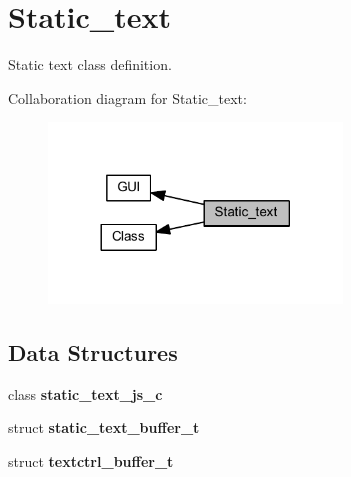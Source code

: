 \section{Static\+\_\+text}
\label{group___static__text}


Static text class definition.  


Collaboration diagram for Static\+\_\+text\+:
\nopagebreak
\begin{figure}[H]
\begin{center}
\leavevmode
\includegraphics[width=221pt]{group___static__text}
\end{center}
\end{figure}
\subsection*{Data Structures}
\begin{DoxyCompactItemize}
\item 
class \textbf{ static\+\_\+text\+\_\+js\+\_\+c}
\item 
struct \textbf{ static\+\_\+text\+\_\+buffer\+\_\+t}
\item 
struct \textbf{ textctrl\+\_\+buffer\+\_\+t}
\end{DoxyCompactItemize}
